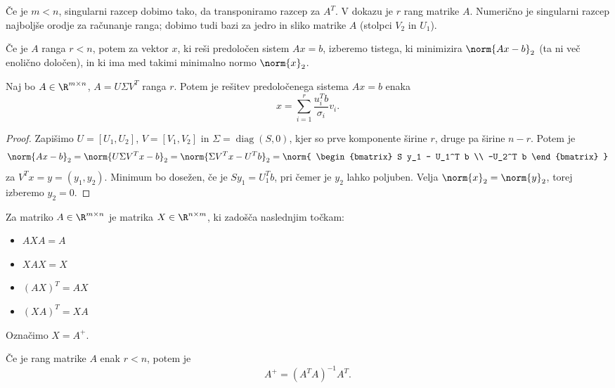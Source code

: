 Če je $m < n$, singularni razcep dobimo tako, da transponiramo razcep za $A^T$.
V dokazu je $r$ rang matrike $A$.
Numerično je singularni razcep najboljše orodje za računanje ranga; dobimo tudi
bazi za jedro in sliko matrike $A$ (stolpci $V_2$ in $U_1$).


Če je $A$ ranga $r < n$, potem za vektor $x$, ki reši predoločen sistem $A x =
b$, izberemo tistega, ki minimizira $\norm{Ax-b}_2$ (ta ni več enolično
določen), in ki ima med takimi minimalno normo $\norm{x}_2$.

\begin{izrek}
  Naj bo $A \in \R^{m \times n}$, $A = U \Sigma V^T$ ranga $r$.
  Potem je rešitev predoločenega sistema $Ax = b$ enaka
  \[
	x = \sum_{i=1}^r \frac{u_i^T b}{\sigma_i} v_i.
  \]
\end{izrek}

\begin{proof}
  Zapišimo $U = [U_1, U_2]$, $V = [V_1, V_2]$ in $\Sigma = \operatorname{diag}(S,
  0)$, kjer so prve komponente širine $r$, druge pa širine $n-r$.
  Potem je
  \[
	\norm{Ax-b}_2 = \norm{U \Sigma V^T x - b}_2
	= \norm{\Sigma V^T x - U^T b}_2
	= \norm{
	  \begin{bmatrix}
		S y_1 - U_1^T b \\
		-U_2^T b
	  \end{bmatrix}
	}
  \]
  za $V^T x = y = (y_1, y_2)$.
  Minimum bo dosežen, če je $S y_1 = U_1^T b$, pri čemer je $y_2$ lahko
  poljuben.
  Velja $\norm{x}_2 = \norm{y}_2$, torej izberemo $y_2 = 0$.
\end{proof}


\begin{definicija}
  Za matriko $A \in \R^{m\times n}$ je  matrika $X \in \R^{n
	\times m}$, ki zadošča naslednjim točkam:
  \begin{itemize}
  \item $A X A = A$
  \item $X A X = X$
  \item $(AX)^T = AX$
  \item $(XA)^T = XA$
  \end{itemize}
  Označimo $X = A^+$.
\end{definicija}

Če je rang matrike $A$ enak $r <n$, potem je
\[
  A^+ = (A^T A)^{-1} A^T.
\]

